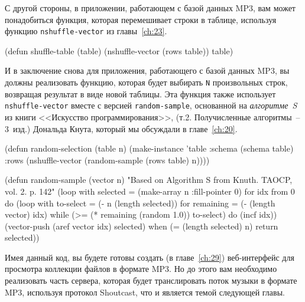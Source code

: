 С другой стороны, в приложении, работающем с базой данных MP3, вам может понадобиться
функция, которая перемешивает строки в таблице, используя функцию \lstinline{nshuffle-vector}
из главы~\ref{ch:23}.

\begin{myverb}
(defun shuffle-table (table)
  (nshuffle-vector (rows table))
  table)
\end{myverb}

И в заключение снова для приложения, работающего с базой данных MP3, вы должны реализовать
функцию, которая будет выбирать \lstinline{N} произвольных строк, возвращая результат в виде
новой таблицы.  Эта функция также использует \lstinline{nshuffle-vector} вместе с версией
\lstinline{random-sample}, основанной на \textit{алгоритме~S} из книги <<Искусство
программирования>>, (т.2.  Получисленные алгоритмы~-- 3~изд.) Дональда Кнута, который мы
обсуждали в главе~\ref{ch:20}.

\begin{myverb}
(defun random-selection (table n)
  (make-instance
   'table
   :schema (schema table)
   :rows (nshuffle-vector (random-sample (rows table) n))))

(defun random-sample (vector n)
  "Based on Algorithm S from Knuth. TAOCP, vol. 2. p. 142"
  (loop with selected = (make-array n :fill-pointer 0)
     for idx from 0
     do
       (loop
          with to-select = (- n (length selected))
          for remaining = (- (length vector) idx)
          while (>= (* remaining (random 1.0)) to-select)
          do (incf idx))
       (vector-push (aref vector idx) selected)
     when (= (length selected) n) return selected))
\end{myverb}

Имея данный код, вы будете готовы создать (в главе~\ref{ch:29}) веб-интерфейс для
просмотра коллекции файлов в формате MP3.  Но до этого вам необходимо реализовать часть
сервера, которая будет транслировать поток музыки в формате MP3, используя протокол
Shoutcast, что и является темой следующей главы.

